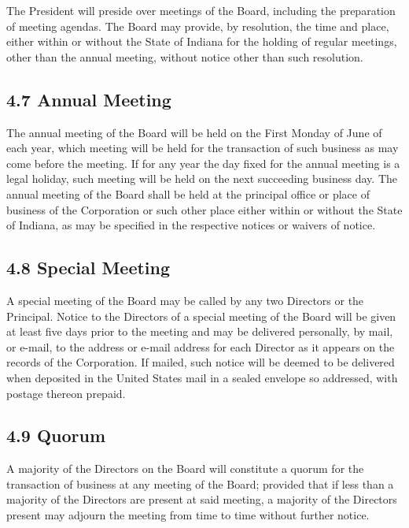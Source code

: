 \documentclass[
]{book}
\begin{document}
The President will preside over meetings of the Board, including the preparation of meeting agendas. The Board may provide, by resolution, the time and place, either within or without the State of Indiana for the holding of regular meetings, other than the annual meeting, without notice other than such resolution.

\subsection*{4.7 Annual Meeting}\label{annual-meeting}

The annual meeting of the Board will be held on the First Monday of June of each year, which meeting will be held for the transaction of such business as may come before the meeting. If for any year the day fixed for the annual meeting is a legal holiday, such meeting will be held on the next succeeding business day. The annual meeting of the Board shall be held at the principal office or place of business of the Corporation or such other place either within or without the State of Indiana, as may be specified in the respective notices or waivers of notice.

\subsection*{4.8 Special Meeting}\label{special-meeting}

A special meeting of the Board may be called by any two Directors or the Principal. Notice to the Directors of a special meeting of the Board will be given at least five days prior to the meeting and may be delivered personally, by mail, or e-mail, to the address or e-mail address for each Director as it appears on the records of the Corporation. If mailed, such notice will be deemed to be delivered when deposited in the United States mail in a sealed envelope so addressed, with postage thereon prepaid.

\subsection*{4.9 Quorum}\label{quorum}

A majority of the Directors on the Board will constitute a quorum for the transaction of business at any meeting of the Board; provided that if less than a majority of the Directors are present at said meeting, a majority of the Directors present may adjourn the meeting from time to time without further notice.
\end{document}

